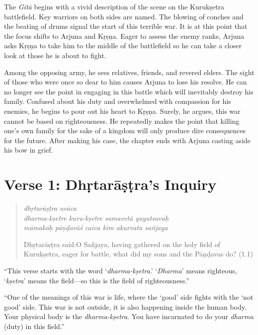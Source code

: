 \documentclass[12pt, twoside, openright]{memoir}
\begin{document}
\noindent The \textit{Gītā} begins with a vivid description of the scene on the Kurukṣetra battlefield. Key warriors on both sides are named. The blowing of conches and the beating of drums signal the start of this terrible war. It is at this point that the focus shifts to Arjuna and Kṛṣṇa. Eager to assess the enemy ranks, Arjuna asks Kṛṣṇa to take him to the middle of the battlefield so he can take a closer look at those he is about to fight.

Among the opposing army, he sees relatives, friends, and revered elders. The sight of those who were once so dear to him causes Arjuna to lose his resolve. He can no longer see the point in engaging in this battle which will inevitably destroy his family. Confused about his duty and overwhelmed with compassion for his enemies, he begins to pour out his heart to Kṛṣṇa. Surely, he argues, this war cannot be based on righteousness. He repeatedly makes the point that killing one’s own family for the sake of a kingdom will only produce dire consequences for the future. After making his case, the chapter ends with Arjuna casting aside his bow in grief.

\section{Verse 1: Dhṛtarāṣṭra's Inquiry}\label{sec-verse-1-dhrtarastra-s-inquiry}


\par
\begin{verse}
\textit{dhṛtarāṣṭra uvāca} \\
\textit{dharma-kṣetre kuru-kṣetre samavetā yuyutsavaḥ} \\
\textit{māmakāḥ pāṇḍavāś caiva kim akurvata sañjaya}

\noindent \quad Dhṛtarāṣṭra said:\linebreak O Sañjaya, having gathered on the holy field of Kurukṣetra, eager for battle, what did my sons and the Pāṇḍavas do? (1.1)
\end{verse}
\par


\enquote{This verse starts with the word \enquote{\textit{dharma-kṣetra}.} \enquote{\textit{Dharma}} means righteous, \enquote{\textit{kṣetra}} means the field---so this is the field of righteousness.}

\enquote{One of the meanings of this war is life, where the \enquote{good} side fights with the \enquote{not good} side. This war is not outside, it is also happening inside the human body. Your physical body is the \textit{dharma-kṣetra}. You have incarnated to do your \textit{dharma} (duty) in this field.}
\end{document}
